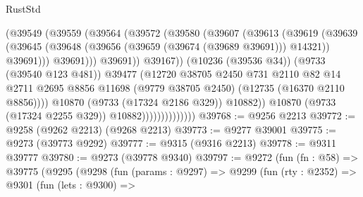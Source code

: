 \begin{lexlean}{RustStd}
\begin{coremodule}
{\begin{coremodule}
{{{{{{{{{{{{{{{{{{{{{{{{{{{{{{{{{{{{{{{{{{{{{{{{{{{{{{{                                      (@39549
                                        (@39559
                                          (@39564
                                            (@39572
                                              (@39580
                                                (@39607
                                                  (@39613
                                                    (@39619
                                                      (@39639
                                                        (@39645
                                                          (@39648
                                                            (@39656
                                                              (@39659 (@39674 (@39689 @39691)))
                                                              @14321))
                                                          @39691)))
                                                    @39691)))
                                              @39691))
                                          @39167))
                                      (@10236 (@39536 @34))
                                      (@9733 (@39540 @123 @481))
                                      @39477
                                      (@12720
                                        @38705
                                        @2450
                                        @731
                                        @2110
                                        @82
                                        @14
                                        @2711
                                        @2695
                                        @8856
                                        @11698
                                        (@9779 @38705 @2450)
                                        (@12735 (@16370 @2110 @8856))))
                                    @10870
                                    (@9733 (@17324 @2186 @329))
                                    @10882))
                                @10870
                                (@9733 (@17324 @2255 @329))
                                @10882))))))))))))))
@39768 := @9256 @2213
@39772 := @9258 (@9262 @2213) (@9268 @2213)
@39773 := @9277 @39001
@39775 := @9273 (@39773 @9292)
@39777 := @9315 (@9316 @2213)
@39778 := @9311 @39777
@39780 := @9273 (@39778 @9340)
@39797 := @9272
    (fun (fn : @58) =>
    @39775
      (@9295
        (@9298
          (fun (params : @9297) =>
          @9299
            (fun (rty : @2352) =>
            @9301
              (fun (lets : @9300) =>
}}}}}}}}}}}}}}}}}}}}}}}}}}}}}}}}}}}}}}}}}}}}}}}}}}}}}}}
\end{coremodule}}
\end{coremodule}
\end{lexlean}
